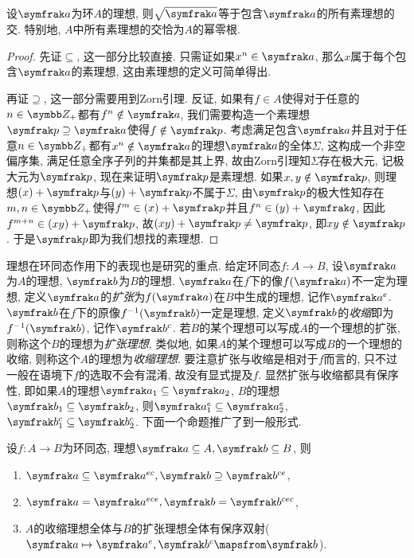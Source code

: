 \begin{proposition}\label{prop:scheinnullstellensatz}
  设$\ideal{a}$为环$A$的理想, 则$\sqrt{\ideal{a}}$等于包含$\ideal{a}$的所有素理想的交. 特别地, $A$中所有素理想的交恰为$A$的幂零根.
\end{proposition}

\begin{proof}
  先证$\subseteq$, 这一部分比较直接. 只需证如果$x^n\in\ideal{a}$, 那么$x$属于每个包含$\ideal{a}$的素理想, 这由素理想的定义可简单得出.

  再证$\supseteq$, 这一部分需要用到Zorn引理. 反证, 如果有$f\in A$使得对于任意的$n\in\ZZ_+$都有$f^n\notin\ideal{a}$, 我们需要构造一个素理想$\ideal{p}\supseteq\ideal{a}$使得$f\notin\ideal{p}$. 考虑满足包含$\ideal{a}$并且对于任意$n\in\ZZ_+$都有$x^n\notin\ideal{a}$的理想$\ideal{a}$的全体$\Sigma$, 这构成一个非空偏序集, 满足任意全序子列的并集都是其上界, 故由Zorn引理知$\Sigma$存在极大元, 记极大元为$\ideal{p}$, 现在来证明$\ideal{p}$是素理想. 如果$x, y\notin\ideal{p}$, 则理想$(x)+\ideal{p}$与$(y)+\ideal{p}$不属于$\Sigma$, 由$\ideal{p}$的极大性知存在$m, n\in\ZZ_+$使得$f^m\in (x)+\ideal{p}$并且$f^n\in (y)+\ideal{q}$, 因此$f^{m+n}\in (xy)+\ideal{p}$, 故$(xy)+\ideal{p}\neq\ideal{p}$, 即$xy\notin\ideal{p}$. 于是$\ideal{p}$即为我们想找的素理想.
\end{proof}

理想在环同态作用下的表现也是研究的重点. 给定环同态$f\colon A\to B$, 设$\ideal{a}$为$A$的理想, $\ideal{b}$为$B$的理想. $\ideal{a}$在$f$下的像$f(\ideal{a})$不一定为理想, 定义$\ideal{a}$的\emph{扩张}为$f(\ideal{a})$在$B$中生成的理想, 记作$\ideal{a}^e$. $\ideal{b}$在$f$下的原像$f^{-1}(\ideal{b})$一定是理想, 定义$\ideal{b}$的\emph{收缩}即为$f^{-1}(\ideal{b})$, 记作$\ideal{b}^c$. 若$B$的某个理想可以写成$A$的一个理想的扩张, 则称这个$B$的理想为\emph{扩张理想}, 类似地, 如果$A$的某个理想可以写成$B$的一个理想的收缩, 则称这个$A$的理想为\emph{收缩理想}. 要注意扩张与收缩是相对于$f$而言的, 只不过一般在语境下$f$的选取不会有混淆, 故没有显式提及$f$. 显然扩张与收缩都具有保序性, 即如果$A$的理想$\ideal{a}_1\subseteq\ideal{a}_2$, $B$的理想$\ideal{b}_1\subseteq\ideal{b}_2$, 则$\ideal{a}_1^e\subseteq\ideal{a}_2^e$, $\ideal{b}_1^c\subseteq\ideal{b}_2^c$. 下面一个命题推广了到一般形式.

\begin{proposition}\label{prop:extencontrcorr}
  设$f\colon A\to B$为环同态, 理想$\ideal{a}\subseteq A, \ideal{b}\subseteq B$, 则
  \begin{enumerate}
    \item $\ideal{a}\subseteq\ideal{a}^{ec}, \ideal{b}\supseteq\ideal{b}^{ce}$,
    \item $\ideal{a}=\ideal{a}^{ece}, \ideal{b}=\ideal{b}^{cec}$,
    \item\label{enum:prop-ec-corr} $A$的收缩理想全体与$B$的扩张理想全体有保序双射($\ideal{a}\mapsto\ideal{a}^e, \ideal{b}^c\mapsfrom\ideal{b}$).
  \end{enumerate}
\end{proposition}


